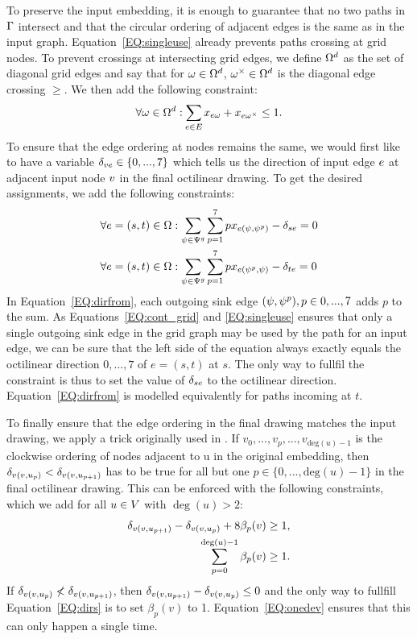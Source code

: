 \documentclass{sig-alternate-sigmod09}
\begin{document}
To preserve the input embedding, it is enough to guarantee that no two paths in $\Gamma$ intersect and that the circular ordering of adjacent edges is the same as in the input graph.
Equation~\ref{EQ:singleuse} already prevents paths crossing at grid nodes.
To prevent crossings at intersecting grid edges, we define $\Omega^d$ as the set of diagonal grid edges and say that for $\omega \in \Omega^d$, $\omega^{\times} \in \Omega^d$ is the diagonal edge crossing $\ge$. 
We then add the following constraint:
%
\begin{equation}
  \forall \ge \in \gE^d: \Psum{\ie \in \iE} \geused{\ie}{\ge} + \geused{\ie}{\ge^{\times}} \leq 1. \label{EQ:crossing}
\end{equation}
%
To ensure that the edge ordering at nodes remains the same, we would first like to have a variable $\delta_{ve} \in \{0, ..., 7\}$ which tells us the direction of input edge $e$ at adjacent input node $v$ in the final octilinear drawing.
To get the desired assignments, we add the following constraints:
%
\begin{align}
  \forall e = (s, t) \in \Omega&: \sum_{\psi \in \Psi^g} \sum_{p = 1}^7 p x_{e(\psi,  \psi^p)} - \delta_{se} = 0\label{EQ:dirfrom} \\
  \forall e = (s, t) \in \Omega&: \sum_{\psi \in \Psi^g} \sum_{p = 1}^7 p x_{e(\psi^p, \psi)} - \delta_{te} = 0\label{EQ:dirto}
\end{align}
%
In Equation~\ref{EQ:dirfrom}, each outgoing sink edge $(\psi,  \psi^{p}), p \in {0, ..., 7}$ adds $p$ to the sum.
As Equations~\ref{EQ:cont_grid} and \ref{EQ:singleuse} ensures that only a single outgoing sink edge in the grid graph may be used by the path for an input edge, we can be sure that the left side of the equation always exactly equals the octilinear direction $0, ..., 7$ of $e = (s, t)$ at $s$.
The only way to fullfil the constraint is thus to set the value of $\delta_{se}$ to the octilinear direction.
Equation~\ref{EQ:dirfrom} is modelled equivalently for paths incoming at $t$.

To finally ensure that the edge ordering in the final drawing matches the input drawing, we apply a trick originally used in \cite{noellenburg}.
If $v_0, ..., v_p, ..., v_{\text{deg}(u) - 1}$ is the clockwise ordering of nodes adjacent to u in the original embedding, then $\delta_{v(v, u_{p})} < \delta_{v(v, u_{p + 1})}$ has to be true for all but one $p \in \{0, ..., \text{deg}(u) - 1\}$ in the final octilinear drawing.
This can be enforced with the following constraints, which we add for all  $u \in V$ with $\deg(u) > 2$:
%
\begin{align}
  \delta_{v(v, u_{p + 1})} - \delta_{v(v, u_{p})} + 8\beta_p(v) &\geq 1,\label{EQ:dirs}\\
  \sum_{p = 0}^{\deg(u)-1} \beta_p(v) &\geq 1\label{EQ:onedev}.
\end{align}
%
If $\delta_{v(v, u_{p})} \not< \delta_{v(v, u_{p + 1})}$, then $\delta_{v(v, u_{p + 1})} - \delta_{v(v, u_{p})} \leq 0$ and the only way to fullfill Equation~\ref{EQ:dirs} is to set $\beta_p(v)$ to 1.
Equation~\ref{EQ:onedev} ensures that this can only happen a single time.
\end{document}
